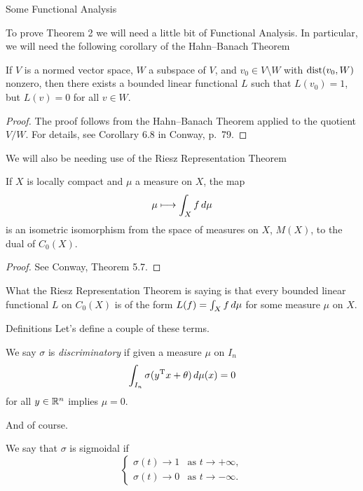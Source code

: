 \documentclass[11pt,letterpaper]{beamer}
\begin{document}
\begin{frame}{Some Functional Analysis}

  To prove Theorem 2 we will need a little bit of Functional Analysis. In
  particular, we will need the following corollary of the Hahn--Banach Theorem
  \begin{corollary}
    If $V$ is a normed vector space, $W$ a subspace of $V$, and $v_0\in
    V\setminus W$ with $\operatorname{dist}(v_0,W)$ nonzero, then there exists a
    bounded linear functional $L$ such that $L(v_0)=1$, but $L(v)=0$ for all
    $v\in W$.
  \end{corollary}
  \begin{proof}
    The proof follows from the Hahn--Banach Theorem applied to the quotient
    $V/W$. For details, see Corollary 6.8 in Conway, p.\ 79.
  \end{proof}
\end{frame}

\begin{frame}
  We will also be needing use of the Riesz Representation Theorem
  \begin{theorem}
    If $X$ is locally compact and $\mu$ a measure on $X$, the map
    \[
      \mu\longmapsto\int_X f\mathop{}\!d\mu
    \]
    is an isometric isomorphism from the space of measures on $X$, $M(X)$, to
    the dual of $C_0(X)$.
  \end{theorem}
  \begin{proof}
    See Conway, Theorem 5.7.
  \end{proof}
  What the Riesz Representation Theorem is saying is that every bounded linear
  functional $L$ on $C_0(X)$ is of the form $L(f)=\int_X f\mathop{}\!d \mu$ for some
  measure $\mu$ on $X$.
\end{frame}

\begin{frame}{Definitions}
  Let's define a couple of these terms.
  \begin{definition}
    We say $\sigma$ is \emph{discriminatory} if given a measure $\mu$ on $I_n$
    \[
      \int_{I_n}\sigma( y^{\mathrm{T}} x+\theta)\mathop{}\!d\mu( x)=0
    \]
    for all $ y\in\mathbb{R}^n$ implies $\mu=0$.
  \end{definition}
  And of course.
  \begin{definition}
    We say that $\sigma$ is sigmoidal if
    \[
      \begin{cases}
        \sigma(t)\to 1&\text{as }t\to +\infty,\\
        \sigma(t)\to 0&\text{as }t\to -\infty.
      \end{cases}
    \]
  \end{definition}
\end{frame}
\end{document}
